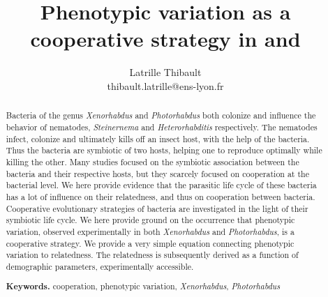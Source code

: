 \documentclass[10pt]{article}
\author{Latrille Thibault\\
\small thibault.latrille@ens-lyon.fr\\[-0.8ex]}
\title{Phenotypic variation as a cooperative strategy in \Xeno and \Photo}
\newcommand{\Xeno}{\textit{Xenorhabdus} }
\newcommand{\Stein}{\textit{Steinernema} }
\newcommand{\Photo}{\textit{Photorhabdus} }
\newcommand{\Hetero}{\textit{Heterorhabditis} }
\begin{document}
%
\begin{abstract}
Bacteria of the genus \Xeno and \Photo both colonize and influence the behavior of nematodes, \Stein and \Hetero respectively.
The nematodes infect, colonize and ultimately kills off an insect host, with the help of the bacteria. 
Thus the bacteria are symbiotic of two hosts, helping one to reproduce optimally while killing the other. 
Many studies focused on the symbiotic association between the bacteria and their respective hosts, but they scarcely focused on cooperation at the bacterial level. 
We here provide evidence that the parasitic life cycle of these bacteria has a lot of influence on their relatedness, and thus on cooperation between bacteria. 
Cooperative evolutionary strategies of bacteria are investigated in the light of their symbiotic life cycle. 
We here provide ground on the occurrence that phenotypic variation, observed experimentally in both \Xeno and \textit{Photorhabdus}, is a cooperative strategy. 
We provide a very simple equation connecting phenotypic variation to relatedness. The relatedness is subsequently derived as a function of demographic parameters, experimentally accessible.


\smallskip
\noindent \textbf{Keywords.} cooperation, phenotypic variation, \textit{Xenorhabdus}, \Photo
\end{abstract}
\end{document}
